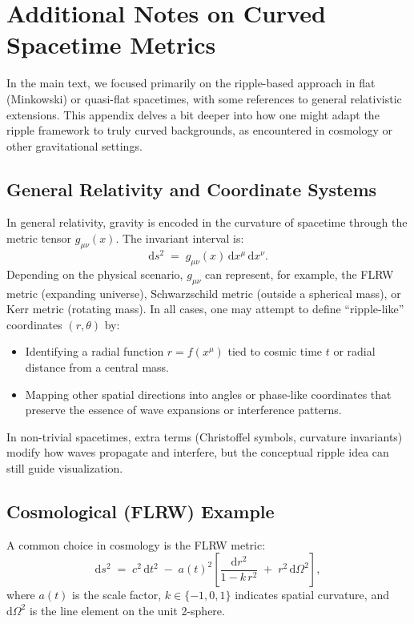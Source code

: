 \documentclass{article}
\begin{document}

\section{Additional Notes on Curved Spacetime Metrics}
\label{app:curved-metrics}

In the main text, we focused primarily on the ripple-based approach 
in flat (Minkowski) or quasi-flat spacetimes, with some references to 
general relativistic extensions. This appendix delves a bit deeper 
into how one might adapt the ripple framework to truly curved 
backgrounds, as encountered in cosmology or other gravitational 
settings.

\subsection{General Relativity and Coordinate Systems}
\label{app:subsec:GR-coord}
In general relativity, gravity is encoded in the curvature of spacetime 
through the metric tensor $g_{\mu\nu}(x)$. The invariant interval is:
\[
  \mathrm{d}s^2 \;=\; g_{\mu\nu}(x)\,\mathrm{d}x^\mu\,\mathrm{d}x^\nu.
\]
Depending on the physical scenario, $g_{\mu\nu}$ can represent, for example, 
the FLRW metric (expanding universe), Schwarzschild metric (outside a spherical mass), 
or Kerr metric (rotating mass). In all cases, one may attempt to define 
``ripple-like'' coordinates $(r,\theta)$ by:

\begin{itemize}
  \item Identifying a radial function $r = f(x^\mu)$ tied to cosmic time $t$ 
        or radial distance from a central mass.
  \item Mapping other spatial directions into angles or phase-like coordinates 
        that preserve the essence of wave expansions or interference patterns.
\end{itemize}

In non-trivial spacetimes, extra terms (Christoffel symbols, curvature invariants) 
modify how waves propagate and interfere, but the conceptual ripple idea 
can still guide visualization.

\subsection{Cosmological (FLRW) Example}
\label{app:subsec:FLRW-example}
A common choice in cosmology is the FLRW metric:
\[
  \mathrm{d}s^2 \;=\; c^2\,\mathrm{d}t^2 
    \;-\; a(t)^2 \left[\frac{\mathrm{d}r^2}{1 - k\,r^2} 
    \;+\; r^2\,\mathrm{d}\Omega^2\right],
\]
where $a(t)$ is the scale factor, $k \in \{-1,0,1\}$ indicates spatial curvature, 
and $\mathrm{d}\Omega^2$ is the line element on the unit 2-sphere. 
\end{document}
